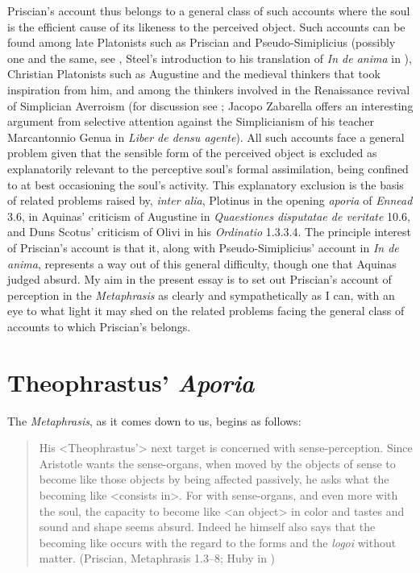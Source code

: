 \documentclass[12pt]{article}
\begin{document}
Priscian's account thus belongs to a general class of such accounts where the soul is the efficient cause of its likeness to the perceived object. Such accounts can be found among late Platonists such as Priscian and Pseudo-Simiplicius (possibly one and the same, see \citealt{Bossier:1972rp}, \citealt{Steel:1978th} Steel's introduction to his translation of \emph{In de anima} in \citealt[103--140]{Sorabji:1997ly}), Christian Platonists such as Augustine and the medieval thinkers that took inspiration from him, and among the thinkers involved in the Renaissance revival of Simplician Averroism (for discussion see \citealt[chapter 8]{Spruit:1995fh}; Jacopo Zabarella offers an interesting argument from selective attention against the Simplicianism of his teacher Marcantonnio Genua in \emph{Liber de densu agente}). All such accounts face a general problem given that the sensible form of the perceived object is excluded as explanatorily relevant to the perceptive soul's formal assimilation, being confined to at best occasioning the soul's activity. This explanatory exclusion is the basis of related problems raised by, \emph{inter alia}, Plotinus in the opening \emph{aporia} of \emph{Ennead} 3.6, in Aquinas' criticism of Augustine in \emph{Quaestiones disputatae de veritate} 10.6, and Duns Scotus' criticism of Olivi in his \emph{Ordinatio} 1.3.3.4. The principle interest of Priscian's account is that it, along with Pseudo-Simiplicius' account in \emph{In de anima}, represents a way out of this general difficulty, though one that Aquinas judged absurd. My aim in the present essay is to set out Priscian's account of perception in the \emph{Metaphrasis} as clearly and sympathetically as I can, with an eye to what light it may shed on the related problems facing the general class of accounts to which Priscian's belongs.


\section{Theophrastus' \emph{Aporia}} %
\label{sec:theophrastus_emph_aporia}

The \emph{Metaphrasis}, as it comes down to us, begins as follows:
\begin{quote}
	His <Theophrastus'> next target is concerned with sense-perception. Since Aristotle wants the sense-organs, when moved by the objects of sense to become like those objects by being affected passively, he asks what the becoming like <consists in>. For with sense-organs, and even more with the soul, the capacity to become like <an object> in color and tastes and sound and shape seems absurd. Indeed he himself also says that the becoming like occurs with the regard to the forms and the \emph{logoi} without matter. (Priscian, Metaphrasis 1.3--8; Huby in \citealt{Sorabji:1997ly})
\end{quote}
\end{document}
